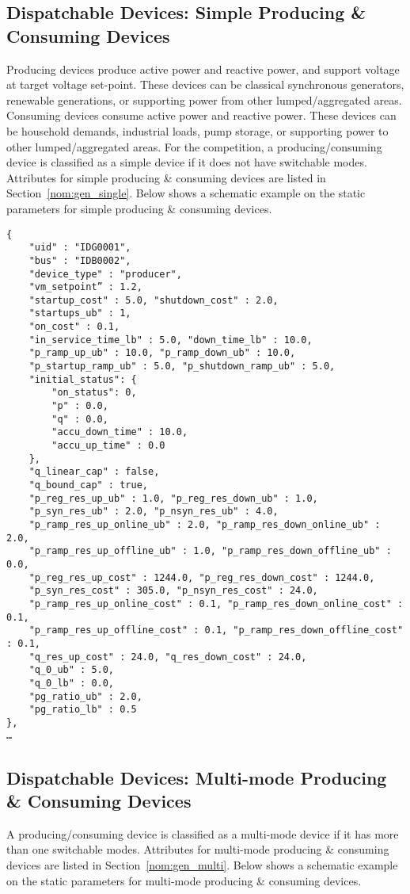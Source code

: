 \subsection{Dispatchable Devices: Simple Producing \& Consuming Devices}
\label{sec:generator}
Producing devices
produce active power and reactive power, and support voltage at target voltage set-point.
These devices can be classical synchronous generators, renewable generations, or supporting 
power from other lumped/aggregated areas. 
Consuming devices consume active power and reactive power.
These devices can be household demands, industrial loads, pump storage, or
supporting power to other lumped/aggregated areas. 
For the competition, a producing/consuming device is classified as a simple device if it
does not have switchable modes.
Attributes for simple producing \& consuming devices are listed in Section~\ref{nom:gen_single}.
Below shows a schematic example on the static parameters for simple producing \& consuming devices.

\begin{verbatim}
{
    "uid" : "IDG0001",
    "bus" : "IDB0002",
    "device_type" : "producer",
    "vm_setpoint” : 1.2,
    "startup_cost" : 5.0, "shutdown_cost" : 2.0,
    "startups_ub" : 1,
    "on_cost" : 0.1,
    "in_service_time_lb" : 5.0, "down_time_lb" : 10.0,
    "p_ramp_up_ub" : 10.0, "p_ramp_down_ub" : 10.0, 
    "p_startup_ramp_ub" : 5.0, "p_shutdown_ramp_ub" : 5.0,
    "initial_status": {
        "on_status": 0,
        "p" : 0.0,
        "q" : 0.0,
        "accu_down_time" : 10.0,
        "accu_up_time" : 0.0
    },
    "q_linear_cap" : false, 
    "q_bound_cap" : true, 
    "p_reg_res_up_ub" : 1.0, "p_reg_res_down_ub" : 1.0,
    "p_syn_res_ub" : 2.0, "p_nsyn_res_ub" : 4.0, 
    "p_ramp_res_up_online_ub" : 2.0, "p_ramp_res_down_online_ub" : 2.0,
    "p_ramp_res_up_offline_ub" : 1.0, "p_ramp_res_down_offline_ub" : 0.0,
    "p_reg_res_up_cost" : 1244.0, "p_reg_res_down_cost" : 1244.0,
    "p_syn_res_cost" : 305.0, "p_nsyn_res_cost" : 24.0, 
    "p_ramp_res_up_online_cost" : 0.1, "p_ramp_res_down_online_cost" : 0.1,
    "p_ramp_res_up_offline_cost" : 0.1, "p_ramp_res_down_offline_cost" : 0.1,
    "q_res_up_cost" : 24.0, "q_res_down_cost" : 24.0,
    "q_0_ub" : 5.0,
    "q_0_lb" : 0.0,
    "pg_ratio_ub" : 2.0,
    "pg_ratio_lb" : 0.5    
},
…     
\end{verbatim}

\subsection{Dispatchable Devices: Multi-mode Producing \& Consuming Devices}
\label{sec:multi-generator}
A producing/consuming device is classified as a multi-mode device if it
has more than one switchable modes.
Attributes for multi-mode producing \& consuming devices are listed in Section~\ref{nom:gen_multi}.
Below shows a schematic example on the static parameters for multi-mode producing \& consuming devices.


